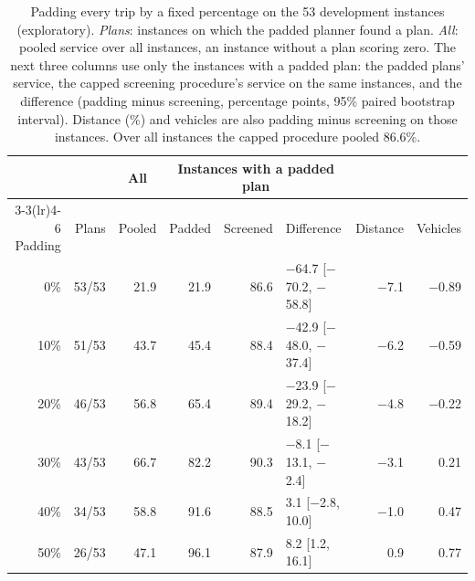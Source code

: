 \begin{table}[t]
\centering
\small
\setlength{\tabcolsep}{4pt}
\caption{Padding every trip by a fixed percentage on the 53 development instances (exploratory). \emph{Plans}: instances on which the padded planner found a plan. \emph{All}: pooled service over all instances, an instance without a plan scoring zero. The next three columns use only the instances with a padded plan: the padded plans' service, the capped screening procedure's service on the same instances, and the difference (padding minus screening, percentage points, 95\% paired bootstrap interval). Distance (\%) and vehicles are also padding minus screening on those instances. Over all instances the capped procedure pooled 86.6\%.}
\label{tab:padding}
\begin{tabular}{@{}rrrrrlrr@{}}
\toprule
 & & \multicolumn{1}{c}{All} & \multicolumn{3}{c}{Instances with a padded plan} & & \\
\cmidrule(lr){3-3}\cmidrule(lr){4-6}
Padding & Plans & Pooled & Padded & Screened & Difference & Distance & Vehicles\\
\midrule
0\% & 53/53 & 21.9 & 21.9 & 86.6 & $-$64.7 [$-$70.2, $-$58.8] & $-$7.1 & $-$0.89\\
10\% & 51/53 & 43.7 & 45.4 & 88.4 & $-$42.9 [$-$48.0, $-$37.4] & $-$6.2 & $-$0.59\\
20\% & 46/53 & 56.8 & 65.4 & 89.4 & $-$23.9 [$-$29.2, $-$18.2] & $-$4.8 & $-$0.22\\
30\% & 43/53 & 66.7 & 82.2 & 90.3 & $-$8.1 [$-$13.1, $-$2.4] & $-$3.1 & 0.21\\
40\% & 34/53 & 58.8 & 91.6 & 88.5 & 3.1 [$-$2.8, 10.0] & $-$1.0 & 0.47\\
50\% & 26/53 & 47.1 & 96.1 & 87.9 & 8.2 [1.2, 16.1] & 0.9 & 0.77\\
\bottomrule
\end{tabular}
\end{table}
